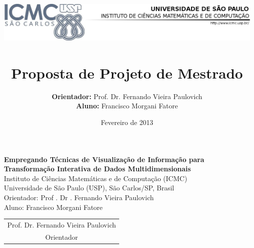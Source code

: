 \documentclass[brazil, a4paper, 12pt, titlepage]{article}
\title{
  \vspace{-4.5cm}
  \includegraphics[width=15cm]{images/logo.png}\\
  \vspace{6cm}
  \renewcommand{\baselinestretch}{1.75}{%
    \huge \doctitle}
  \vspace{2cm}
  \Large \\
  Proposta de Projeto de Mestrado \\
}
\author{
  \textbf{Orientador:} Prof. Dr. Fernando Vieira Paulovich\\
  \textbf{Aluno:} Francisco Morgani Fatore\\
}
\date{Fevereiro de 2013}
\newcommand{\doctitle}{Empregando Técnicas de Visualização
de Informação para Transformação Interativa de Dados
Multidimensionais}
\renewcommand{\baselinestretch}{1.75}{%
    \huge \doctitle}
\renewcommand{\baselinestretch}{1.5} %
\begin{document}
\maketitle

\clearpage
\thispagestyle{empty}

\begin{center}
  \renewcommand{\baselinestretch}{1.0}{
    \large{\textbf{\doctitle}\\
    \huge }
    \vspace{1.5cm}
    \normalsize{Instituto de Ciências Matemáticas e de Computação (ICMC)\\
    Universidade de São Paulo (USP), São Carlos/SP, Brasil}\\
    \vspace{1cm}
    \normalsize{Orientador: Prof . Dr . Fernando Vieira Paulovich\\
    Aluno: Francisco Morgani Fatore}
  }
  \vspace{1cm}
\end{center}



\clearpage

\thispagestyle{empty}
\tableofcontents  
\clearpage

\setcounter{page}{1}







\clearpage
\printbibliography

\vspace{1.5cm}
\begin{table}[htb]
  \centering
  \begin{tabular}{c}
    \hline
    Prof. Dr. Fernando Vieira Paulovich\\
    Orientador
  \end{tabular} 
\end{table}
\end{document}
